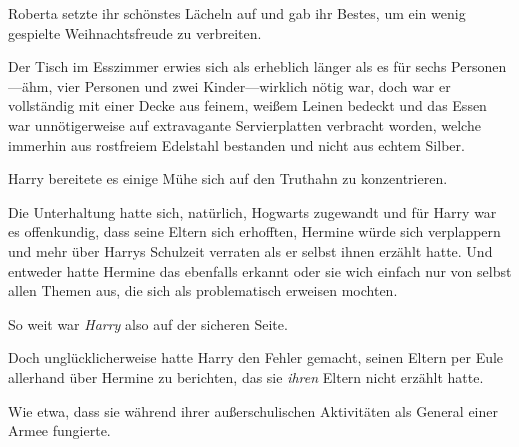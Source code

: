 Roberta setzte ihr schönstes Lächeln auf und gab ihr Bestes, um ein wenig gespielte Weihnachtsfreude zu verbreiten.

\later

Der Tisch im Esszimmer erwies sich als erheblich länger als es für sechs Personen—ähm, vier Personen und zwei Kinder—wirklich nötig war, doch war er vollständig mit einer Decke aus feinem, weißem Leinen bedeckt und das Essen war unnötigerweise auf extravagante Servierplatten verbracht worden, welche immerhin aus rostfreiem Edelstahl bestanden und nicht aus echtem Silber.

Harry bereitete es einige Mühe sich auf den Truthahn zu konzentrieren.

Die Unterhaltung hatte sich, natürlich, Hogwarts zugewandt und für Harry war es offenkundig, dass seine Eltern sich erhofften, Hermine würde sich verplappern und mehr über Harrys Schulzeit verraten als er selbst ihnen erzählt hatte. Und entweder hatte Hermine das ebenfalls erkannt oder sie wich einfach nur von selbst allen Themen aus, die sich als problematisch erweisen mochten.

So weit war \emph{Harry} also auf der sicheren Seite.

Doch unglücklicherweise hatte Harry den Fehler gemacht, seinen Eltern per Eule allerhand über Hermine zu berichten, das sie \emph{ihren} Eltern nicht erzählt hatte.

Wie etwa, dass sie während ihrer außerschulischen Aktivitäten als General einer Armee fungierte.

